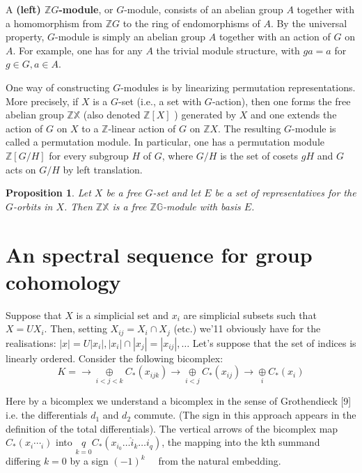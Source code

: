 \documentclass{book}
\newtheorem{prop}{Proposition}
\begin{document}
A \textbf{(left) $\mathbb{Z} G$-module}, or $G$-module, consists of an abelian group $A$ together with a homomorphism from $\mathbb{Z} G$ to the ring of endomorphisms of $A$. By the universal property, $G$-module is simply an abelian group $A$ together with an action of $G$ on $A$. For example, one has for any $A$ the trivial module structure, with $g a=a$ for $g \in G, a \in A$.

One way of constructing $G$-modules is by linearizing permutation representations. More precisely, if $X$ is a $G$-set (i.e., a set with $G$-action), then one forms the free abelian group $\mathbb{Z X}$ (also denoted $\mathbb{Z}[X]$ ) generated by $X$ and one extends the action of $G$ on $X$ to a $\mathbb{Z}$-linear action of $G$ on $\mathbb{Z} X$. The resulting $G$-module is called a permutation module. In particular, one has a permutation module $\mathbb{Z}[G / H]$ for every subgroup $H$ of $G$, where $G / H$ is the set of cosets $g H$ and $G$ acts on $G / H$ by left translation.

\begin{prop}
Let $X$ be a free $G$-set and let $E$ be a set of representatives for the $G$-orbits in $X$. Then $\mathbb{Z X}$ is a free $\mathbb{Z G}$-module with basis $E$.
\end{prop}







\section{An spectral sequence for group cohomology}

Suppose that $X$ is a simplicial set and $x_i$ are simplicial subsets such that $X=U X_i$. Then, setting $X_{i j}=X_i \cap X_j$ (etc.) we'11 obviously have for the realisations: $|x|=U\left|x_i\right|,\left|x_i\right| \cap\left|x_j\right|=\left|x_{i j}\right|, \ldots$ Let's suppose that the set of indices is linearly ordered. Consider the following bicomplex:
$$ K = \longrightarrow \underset{i<j<k}{\oplus} C_*\left(x_{i j k}\right) \longrightarrow \underset{i<j}{\oplus} C_*\left(x_{i j}\right)\longrightarrow \underset{i}{\oplus} C_*\left(x_{i}\right) $$


Here by a bicomplex we understand a bicomplex in the sense of Grothendieck [9] i.e. the differentials $d_1$ and $d_2$ commute. (The sign in this approach appears in the definition of the total differentials). The vertical arrows of the bicomplex map $C_*\left(x_i \cdots_i\right)$ into $\underset{k=0}{q} C_*\left(x_{i_0} \ldots \hat{i}_k \ldots i_q\right)$, the mapping into the kth summand differing $k=0$ by a sign $(-1)^k \quad$ from the natural embedding.
\end{document}
